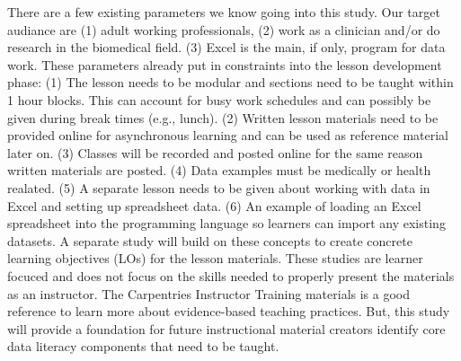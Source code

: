 \documentclass[020-persona\_validation.tex]{subfiles}
\begin{document}

    There are a few existing parameters we know going into this study.
    Our target audiance are
    (1) adult working professionals,
    (2) work as a clinician and/or do research in the biomedical field.
    (3) Excel is the main, if only, program for data work.
    These parameters already put in constraints into the lesson development phase:
    (1) The lesson needs to be modular and sections need to be taught within 1 hour blocks.
    This can account for busy work schedules and can possibly be given during break times (e.g., lunch).
    (2) Written lesson materials need to be provided online for asynchronous learning and can be used as reference material later on.
    (3) Classes will be recorded and posted online for the same reason written materials are posted.
    (4) Data examples must be medically or health realated.
    (5) A separate lesson needs to be given about working with data in Excel and setting up spreadsheet data.
    (6) An example of loading an Excel spreadsheet into the programming language so learners can import any existing datasets.
    A separate study will build on these concepts to create concrete learning objectives (LOs) for the lesson materials.
    These studies are learner focuced and does not focus on the skills needed to properly present the materials as an instructor.
    The Carpentries Instructor Training materials is a good reference to learn more about evidence-based teaching practices.
    But, this study will provide a foundation for future instructional material creators identify core data literacy components
    that need to be taught.
\end{document}
